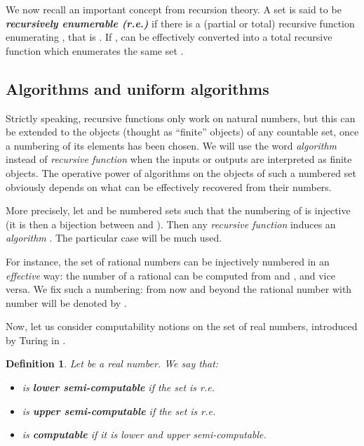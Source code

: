 \documentclass[copyright,creativecommons]{eptcs}
\newtheorem{definition}{Definition}
\numberwithin{equation}{section}
\begin{document}
We now recall an important concept from recursion theory. A set  is said to be \textbf{\emph{recursively enumerable (r.e.)}} if
there is a (partial or total) recursive function  enumerating , that is . If ,  can be effectively
converted into a total recursive function  which enumerates the same
set .

\subsection{Algorithms and uniform algorithms}

Strictly speaking, recursive functions only work on natural numbers, but
this can be extended to the objects (thought as ``finite'' objects) of any
countable set, once a numbering of its elements has been chosen. We will use
the word \emph{algorithm} instead of \emph{recursive function} when the
inputs or outputs are interpreted as finite objects. The operative power of
algorithms on the objects of such a numbered set obviously depends on what
can be effectively recovered from their numbers.

More precisely, let  and  be numbered sets such that the numbering of  is injective (it is then a bijection between  and ). Then
any \emph{recursive function}  induces an
\emph{algorithm} . The particular case 
will be much used.

For instance, the set  of rational numbers can be injectively
numbered  in an \emph{effective} way: the
number  of a rational  can be computed from  and , and vice
versa. We fix such a numbering: from now and beyond the rational number with
number  will be denoted by .

Now, let us consider computability notions on the set  of real
numbers, introduced by Turing in \cite{Tur36}.

\begin{definition}
Let  be a real number. We say that:

\begin{itemize}
\item  is \textbf{\emph{lower semi-computable}} if the set  is r.e.

\item  is \textbf{\emph{upper semi-computable}} if the set  is r.e.

\item  is \textbf{\emph{computable}} if it is lower and upper
semi-computable.
\end{itemize}
\end{definition}
\end{document}
